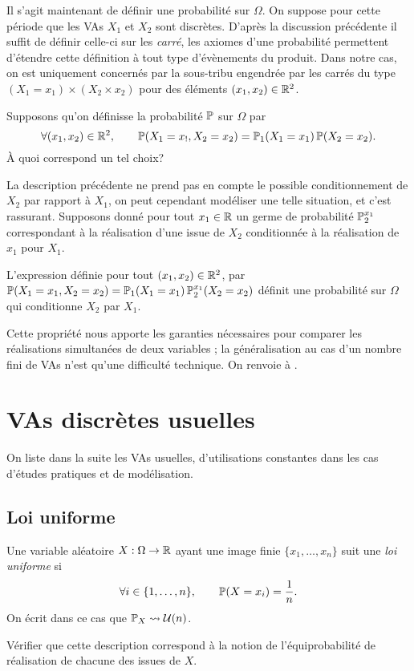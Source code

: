 \documentclass[11pt, a4paper]{article}
\begin{document}
Il s'agit maintenant de définir une probabilité sur $\Omega$. On
suppose pour cette période que les VAs $X_1$ et $X_2$ sont
discrètes. D'après la discussion précédente il suffit de définir
celle-ci sur les \textit{carré}, les axiomes d'une probabilité
permettent d'étendre cette définition à tout type d'évènements du
produit. Dans notre cas, on est uniquement concernés par la sous-tribu
engendrée par les carrés du type $(X_1 = x_1) \times (X_2 \times x_2)$
pour des éléments $(x_1, x_2) \in \mathbb{R}^2$.
\begin{question}
  Supposons qu'on définisse la probabilité $\operatorname{\mathbb{P}}$ sur $\Omega$ par
  \[
    \forall (x_1, x_2) \in \mathbb{R}^2, \qquad \operatorname{\mathbb{P}}(X_1= x_!, X_2 = x_2) =
    \operatorname{\mathbb{P}}_1(X_1 = x_1)\operatorname{\mathbb{P}}(X_2 = x_2).
  \]
  À quoi correspond un tel choix?
\end{question}
La description précédente ne prend pas en compte le possible
conditionnement de $X_2$ par rapport à $X_1$, on peut cependant
modéliser une telle situation, et c'est rassurant. Supposons donné
pour tout $x_1 \in \mathbb{R}$ un germe de probabilité $\operatorname{\mathbb{P}}_2^{x_1}$
correspondant à la réalisation d'une issue de $X_2$ conditionnée à la
réalisation de $x_1$ pour $X_1$.
\begin{prop}
  L'expression définie pour tout $(x_1, x_2) \in \mathbb{R}^2$, par
  $\operatorname{\mathbb{P}}(X_1 = x_1, X_2 = x_2) = \operatorname{\mathbb{P}}_1(X_1 = x_1)\operatorname{\mathbb{P}}_2^{x_1}(X_2 = x_2)$
  définit une probabilité sur $\Omega$ qui conditionne $X_2$ par
  $X_1$.
\end{prop}
Cette propriété nous apporte les garanties nécessaires pour comparer
les réalisations simultanées de deux variables ; la généralisation au
cas d'un nombre fini de VAs n'est qu'une difficulté technique. On
renvoie à \cite[pages 65-67 \& 93]{ouvrard1998probabilites}.

\section{VAs discrètes usuelles}
\label{sec:VAsdiscretesusuelles}

On liste dans la suite les VAs usuelles, d'utilisations constantes
dans les cas d'études pratiques et de modélisation.

\subsection{Loi uniforme}
\label{sec:loiuniforme}

Une variable aléatoire $X : \Omega \to \mathbb{R}$ ayant une image finie
$\{x_1, \ldots, x_n\}$ suit une \emph{loi uniforme} si
\[
  \forall i \in \{1, \ldots, n\}, \qquad \operatorname{\mathbb{P}}(X = x_i) = \frac{1}{n}.
\]
On écrit dans ce cas que $\operatorname{\mathbb{P}}_X \leadsto \mathcal{U}(n)$.
\begin{question}
  Vérifier que cette description correspond à la notion de
  l'équiprobabilité de réalisation de chacune des issues de $X$.
\end{question}
\end{document}
